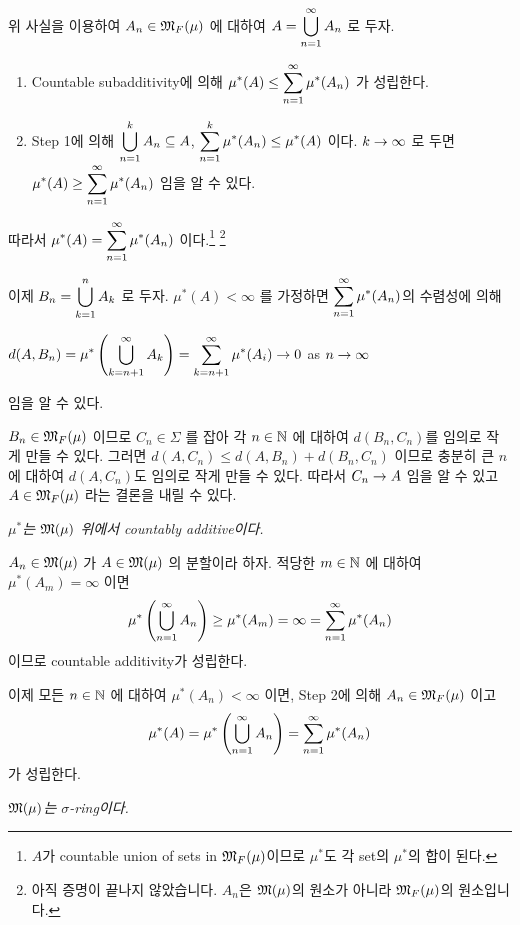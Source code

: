 위 사실을 이용하여 \(A_n \in \mathfrak{M}_F(\mu)\) 에 대하여 \(A = \displaystyle \bigcup_{n=1}^\infty A_n\) 로 두자.
\begin{enumerate}
    \item Countable subadditivity에 의해 \(\displaystyle \mu^\ast(A) \leq \sum_{n=1}^{\infty} \mu^\ast (A_n)\) 가 성립한다.
    \item {\sffamily Step 1}에 의해 \(\displaystyle \bigcup_{n=1}^k A_n \subseteq A\), \(\displaystyle \sum_{n=1}^{k} \mu^\ast(A_n) \leq \mu^\ast(A)\) 이다. \(k \rightarrow \infty\) 로 두면 \(\displaystyle \mu^\ast(A) \geq \sum_{n=1}^\infty \mu^\ast(A_n)\) 임을 알 수 있다.
\end{enumerate}

따라서 \(\displaystyle \mu^\ast(A) = \sum_{n=1}^\infty \mu^\ast(A_n)\) 이다.\footnote{\(A\)가 countable union of sets in \(\mathfrak{M}_F(\mu)\)이므로 \(\mu^\ast\)도 각 set의 \(\mu^\ast\)의 합이 된다.} \footnote{아직 증명이 끝나지 않았습니다. \(A_n\)은 \(\mathfrak{M}(\mu)\)의 원소가 아니라 \(\mathfrak{M}_F(\mu)\)의 원소입니다.}

이제 \(B_n =\displaystyle \bigcup_{k=1}^n A_k\) 로 두자. \(\mu^\ast(A) < \infty\) 를 가정하면 \(\displaystyle \sum_{n=1}^\infty \mu^\ast(A_n)\)의 수렴성에 의해
\begin{center}
    \(\displaystyle d(A, B_n) = \mu^\ast\left( \bigcup_{k=n+1}^\infty A_k \right) = \sum_{k=n+1}^{\infty} \mu^\ast(A_i) \rightarrow 0\) as \(n \rightarrow \infty\)
\end{center}
임을 알 수 있다.

\(B_n \in \mathfrak{M}_F(\mu)\) 이므로 \(C_n \in \Sigma\) 를 잡아 각 \(n \in \mathbb{N}\) 에 대하여 \(d(B_n, C_n)\)를 임의로 작게 만들 수 있다. 그러면 \(d(A, C_n) \leq d(A, B_n) + d(B_n, C_n)\) 이므로 충분히 큰 \(n\)에 대하여 \(d(A, C_n)\)도 임의로 작게 만들 수 있다. 따라서 \(C_n \rightarrow A\) 임을 알 수 있고 \(A \in \mathfrak{M}_F(\mu)\) 라는 결론을 내릴 수 있다.

 \textit{\(\mu^\ast\)는 \(\mathfrak{M}(\mu)\) 위에서 countably additive이다.}

\(A_n \in \mathfrak{M}(\mu)\) 가 \(A \in \mathfrak{M}(\mu)\) 의 분할이라 하자. 적당한 \(m \in \mathbb{N}\) 에 대하여 \(\mu^\ast(A_m) = \infty\) 이면
\[
    \mu^\ast\left( \bigcup_{n=1}^\infty A_n \right) \geq \mu^\ast(A_m) = \infty = \sum_{n=1}^\infty \mu^\ast(A_n)
\]
이므로 countable additivity가 성립한다.

이제 모든 \(n\in \mathbb{N}\) 에 대하여 \(\mu^\ast(A_n) < \infty\) 이면, {\sffamily Step 2}에 의해 \(A_n \in \mathfrak{M}_F(\mu)\) 이고
\[
    \mu^\ast(A) = \mu^\ast\left( \bigcup_{n=1}^\infty A_n \right) = \sum_{n=1}^\infty \mu^\ast(A_n)
\]
가 성립한다.

 \textit{\(\mathfrak{M}(\mu)\)는 \(\sigma\)-ring이다.}


